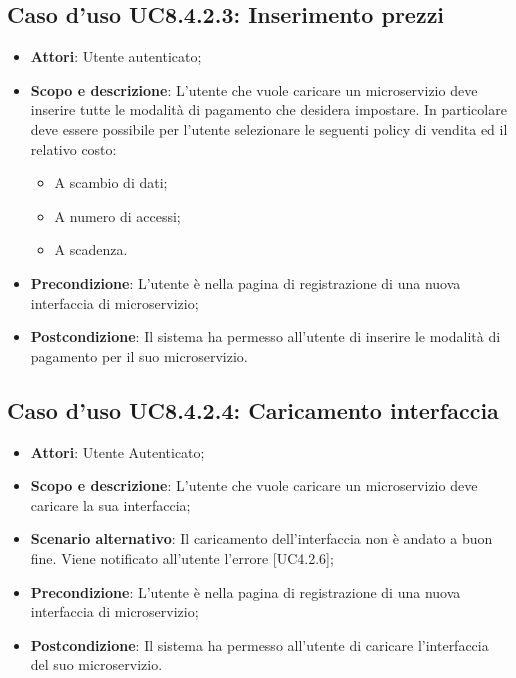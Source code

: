 \documentclass[12pt,a4paper,titlepage]{article}
\begin{document}
	\subsection{Caso d'uso UC8.4.2.3: Inserimento prezzi}
	\label{UC8.4.2.3}
	\begin{itemize}
		\item \textbf{Attori}: Utente autenticato;
		\item \textbf{Scopo e descrizione}: L'utente che vuole caricare un microservizio deve inserire tutte le modalità di pagamento che desidera impostare. In particolare deve essere possibile per l'utente selezionare le seguenti policy di vendita ed il relativo costo:
		\begin{itemize}
			\item A scambio di dati;
			\item A numero di accessi;
			\item A scadenza.
		\end{itemize} 
		\item \textbf{Precondizione}: L'utente è nella pagina di registrazione di una nuova interfaccia di microservizio;
		\item \textbf{Postcondizione}: Il sistema ha permesso all'utente di inserire le modalità di pagamento per il suo microservizio.
	\end{itemize}
	\subsection{Caso d'uso UC8.4.2.4: Caricamento interfaccia}
	\label{UC8.4.2.4}
	\begin{itemize}
		\item \textbf{Attori}: Utente Autenticato;
		\item \textbf{Scopo e descrizione}: L'utente che vuole caricare un microservizio deve caricare la sua interfaccia;
		\item \textbf{Scenario alternativo}: Il caricamento dell'interfaccia non è andato a buon fine. Viene notificato all'utente l'errore [UC4.2.6];
		\item \textbf{Precondizione}: L'utente è nella pagina di registrazione di una nuova interfaccia di microservizio;
		\item \textbf{Postcondizione}: Il sistema ha permesso all'utente di caricare l'interfaccia del suo microservizio.
	\end{itemize}
\end{document}
